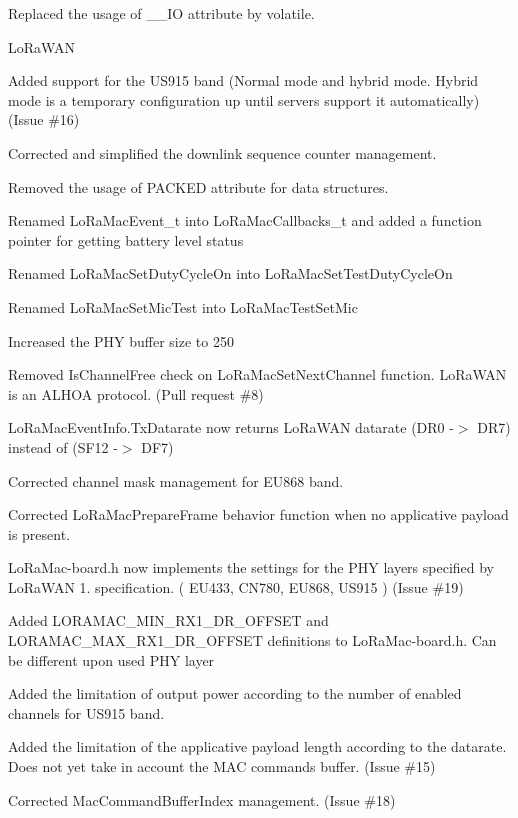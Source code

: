 \begin{DoxyItemize}
\begin{DoxyEnumerate}
\item Replaced the usage of \+\_\+\+\_\+\+IO attribute by volatile.
\end{DoxyEnumerate}
\item Lo\+Ra\+W\+AN
\begin{DoxyEnumerate}
\item Added support for the U\+S915 band (Normal mode and hybrid mode. Hybrid mode is a temporary configuration up until servers support it automatically) (Issue \#16)
\item Corrected and simplified the downlink sequence counter management.
\item Removed the usage of P\+A\+C\+K\+ED attribute for data structures.
\item Renamed Lo\+Ra\+Mac\+Event\+\_\+t into Lo\+Ra\+Mac\+Callbacks\+\_\+t and added a function pointer for getting battery level status
\item Renamed Lo\+Ra\+Mac\+Set\+Duty\+Cycle\+On into Lo\+Ra\+Mac\+Set\+Test\+Duty\+Cycle\+On
\item Renamed Lo\+Ra\+Mac\+Set\+Mic\+Test into Lo\+Ra\+Mac\+Test\+Set\+Mic
\item Increased the P\+HY buffer size to 250
\item Removed Is\+Channel\+Free check on Lo\+Ra\+Mac\+Set\+Next\+Channel function. Lo\+Ra\+W\+AN is an A\+L\+H\+OA protocol. (Pull request \#8)
\item Lo\+Ra\+Mac\+Event\+Info.\+Tx\+Datarate now returns Lo\+Ra\+W\+AN datarate (D\+R0 -\/$>$ D\+R7) instead of (S\+F12 -\/$>$ D\+F7)
\item Corrected channel mask management for E\+U868 band.
\item Corrected Lo\+Ra\+Mac\+Prepare\+Frame behavior function when no applicative payload is present.
\item Lo\+Ra\+Mac-\/board.\+h now implements the settings for the P\+HY layers specified by Lo\+Ra\+W\+AN 1. specification. ( E\+U433, C\+N780, E\+U868, U\+S915 ) (Issue \#19)
\item Added L\+O\+R\+A\+M\+A\+C\+\_\+\+M\+I\+N\+\_\+\+R\+X1\+\_\+\+D\+R\+\_\+\+O\+F\+F\+S\+ET and L\+O\+R\+A\+M\+A\+C\+\_\+\+M\+A\+X\+\_\+\+R\+X1\+\_\+\+D\+R\+\_\+\+O\+F\+F\+S\+ET definitions to Lo\+Ra\+Mac-\/board.\+h. Can be different upon used P\+HY layer
\item Added the limitation of output power according to the number of enabled channels for U\+S915 band.
\item Added the limitation of the applicative payload length according to the datarate. Does not yet take in account the M\+AC commands buffer. (Issue \#15)
\item Corrected Mac\+Command\+Buffer\+Index management. (Issue \#18)
\end{DoxyEnumerate}
\end{DoxyItemize}

